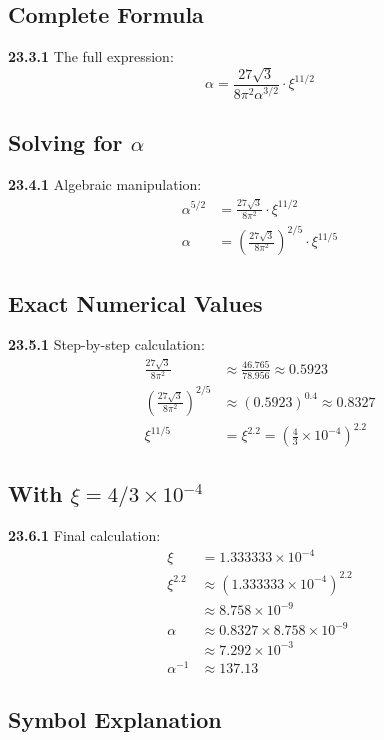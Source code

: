 \documentclass[12pt,a4paper]{article}
\begin{document}
\subsection{Complete Formula}
\noindent \textbf{23.3.1} The full expression:
\begin{equation}
	\alpha = \frac{27\sqrt{3}}{8\pi^2\alpha^{3/2}} \cdot \xi^{11/2}
\end{equation}

\subsection{Solving for $\alpha$}
\noindent \textbf{23.4.1} Algebraic manipulation:
\begin{align}
	\alpha^{5/2} &= \frac{27\sqrt{3}}{8\pi^2} \cdot \xi^{11/2} \\
	\alpha &= \left(\frac{27\sqrt{3}}{8\pi^2}\right)^{2/5} \cdot \xi^{11/5}
\end{align}

\subsection{Exact Numerical Values}
\noindent \textbf{23.5.1} Step-by-step calculation:
\begin{align}
	\frac{27\sqrt{3}}{8\pi^2} &\approx \frac{46.765}{78.956} \approx 0.5923 \\
	\left(\frac{27\sqrt{3}}{8\pi^2}\right)^{2/5} &\approx (0.5923)^{0.4} \approx 0.8327 \\
	\xi^{11/5} &= \xi^{2.2} = \left(\frac{4}{3} \times 10^{-4}\right)^{2.2}
\end{align}

\subsection{With $\xi = 4/3 \times 10^{-4}$}
\noindent \textbf{23.6.1} Final calculation:
\begin{align}
	\xi &= 1.333333 \times 10^{-4} \\
	\xi^{2.2} &\approx (1.333333 \times 10^{-4})^{2.2} \\
	&\approx 8.758 \times 10^{-9} \\
	\alpha &\approx 0.8327 \times 8.758 \times 10^{-9} \\
	&\approx 7.292 \times 10^{-3} \\
	\alpha^{-1} &\approx 137.13
\end{align}

\subsection{Symbol Explanation}
\end{document}
